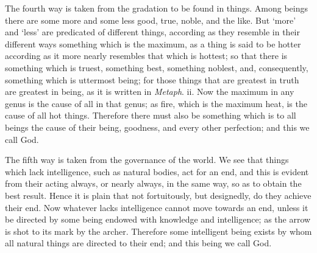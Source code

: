 The fourth way is taken from the gradation to be found in things.
Among beings there are some more and some less good, true, noble, and
the like. But `more' and `less' are predicated of different things,
according as they resemble in their different ways something which is
the maximum, as a thing is said to be hotter according as it more
nearly resembles that which is hottest; so that there is something
which is truest, something best, something noblest, and, consequently,
something which is uttermost being; for those things that are greatest
in truth are greatest in being, as it is written in \textit{Metaph}.
ii. Now the maximum in any genus is the cause of all in that genus; as
fire, which is the maximum heat, is the cause of all hot things.
Therefore there must also be something which is to all beings the
cause of their being, goodness, and every other perfection; and this
we call God.

The fifth way is taken from the governance of the world.  We
see that things which lack intelligence, such as natural bodies, act
for an end, and this is evident from their acting always, or nearly
always, in the same way, so as to obtain the best result. Hence it
is plain that not fortuitously, but designedly, do they achieve their
end. Now whatever lacks intelligence cannot move towards an end,
unless it be directed by some being endowed with knowledge and
intelligence; as the arrow is shot to its mark by the archer.
Therefore some intelligent being exists by whom all natural things are
directed to their end; and this being we call God.

